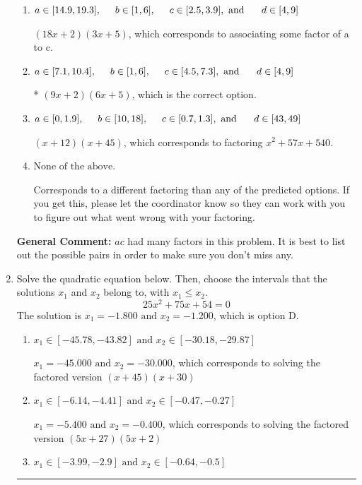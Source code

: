 \documentclass{extbook}[14pt]
\newcommand{\litem}[1]{\item #1

\rule{\textwidth}{0.4pt}}
\begin{document}
\begin{enumerate}
{\begin{enumerate}[label=\Alph*.]
 $(3x + 2)(18x + 5)$, which corresponds to associating some factor of c to a.
\item \( a \in [14.9, 19.3], \hspace*{5mm} b \in [1, 6], \hspace*{5mm} c \in [2.5, 3.9], \text{ and } \hspace*{5mm} d \in [4, 9] \)

 $(18x + 2)(3x + 5)$, which corresponds to associating some factor of a to c.
\item \( a \in [7.1, 10.4], \hspace*{5mm} b \in [1, 6], \hspace*{5mm} c \in [4.5, 7.3], \text{ and } \hspace*{5mm} d \in [4, 9] \)

* $(9x + 2)(6x + 5)$, which is the correct option.
\item \( a \in [0, 1.9], \hspace*{5mm} b \in [10, 18], \hspace*{5mm} c \in [0.7, 1.3], \text{ and } \hspace*{5mm} d \in [43, 49] \)

 $(x + 12)(x + 45)$, which corresponds to factoring $x^{2} +57 x + 540$.
\item \( \text{None of the above.} \)

 Corresponds to a different factoring than any of the predicted options. If you get this, please let the coordinator know so they can work with you to figure out what went wrong with your factoring.
\end{enumerate}

\textbf{General Comment:} $ac$ had many factors in this problem. It is best to list out the possible pairs in order to make sure you don't miss any.
}
\litem{
Solve the quadratic equation below. Then, choose the intervals that the solutions $x_1$ and $x_2$ belong to, with $x_1 \leq x_2$.
\[ 25x^{2} +75 x + 54 = 0 \]The solution is \( x_1 = -1.800 \text{ and } x_2 = -1.200 \), which is option D.\begin{enumerate}[label=\Alph*.]
\item \( x_1 \in [-45.78, -43.82] \text{ and } x_2 \in [-30.18, -29.87] \)

$x_1 = -45.000 \text{ and } x_2 = -30.000$, which corresponds to solving the factored version $(x + 45)(x + 30)$
\item \( x_1 \in [-6.14, -4.41] \text{ and } x_2 \in [-0.47, -0.27] \)

$x_1 = -5.400 \text{ and } x_2 = -0.400$, which corresponds to solving the factored version $(5x + 27)(5x + 2)$
\item \( x_1 \in [-3.99, -2.9] \text{ and } x_2 \in [-0.64, -0.5] \)


\end{enumerate}}
\end{enumerate}
\end{document}
